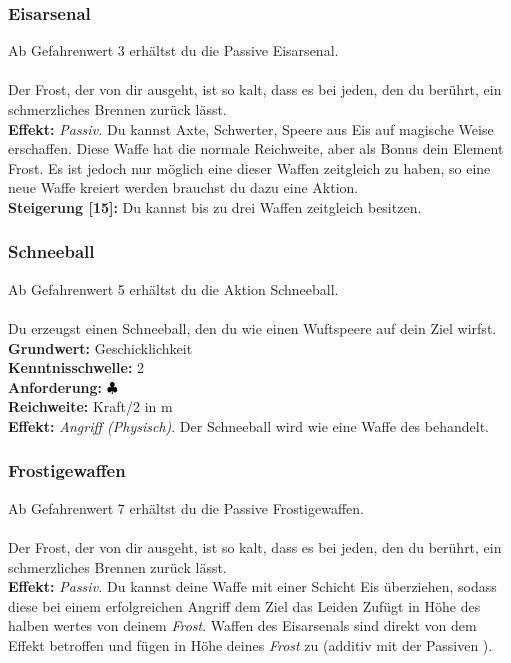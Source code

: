 \subsubsection*{ Eisarsenal} \label{sk:eisarsenal}
Ab Gefahrenwert 3 erhältst du die Passive Eisarsenal.\\
\\
Der Frost, der von dir ausgeht, ist so kalt, dass es bei jeden, den du berührt, ein schmerzliches Brennen zurück lässt.\\
\textbf{Effekt:} \textit{Passiv.} Du kannst Axte, Schwerter, Speere aus Eis auf magische Weise erschaffen. Diese Waffe hat die normale Reichweite, aber als Bonus dein Element Frost. Es ist jedoch nur möglich eine dieser Waffen zeitgleich zu haben, so eine neue Waffe kreiert werden brauchst du dazu eine Aktion.\\
\textbf{Steigerung [15]:} Du kannst bis zu drei Waffen zeitgleich besitzen.

\subsubsection*{ Schneeball} \label{sk:schneeball}
Ab Gefahrenwert 5 erhältst du die Aktion Schneeball.\\
\\
Du erzeugst einen Schneeball, den du wie einen Wuftspeere auf dein Ziel wirfst.\\
\textbf{Grundwert:} Geschicklichkeit \\
\textbf{Kenntnisschwelle:} 2 \\
\textbf{Anforderung:} ${\color{blue} }{\color{black}\clubsuit}$ \\
\textbf{Reichweite:} Kraft/2 in m \\
\textbf{Effekt:} \textit{Angriff (Physisch)}. Der Schneeball wird wie eine Waffe des  behandelt.

\subsubsection*{ Frostigewaffen} \label{sk:frostigewaffen}
Ab Gefahrenwert 7 erhältst du die Passive Frostigewaffen.\\
\\
Der Frost, der von dir ausgeht, ist so kalt, dass es bei jeden, den du berührt, ein schmerzliches Brennen zurück lässt.\\
\textbf{Effekt:} \textit{Passiv.} Du kannst deine Waffe mit einer Schicht Eis überziehen, sodass diese bei einem erfolgreichen Angriff dem Ziel das Leiden  Zufügt in Höhe des halben wertes von deinem \textit{ Frost}. Waffen des Eisarsenals sind direkt von dem Effekt betroffen und fügen  in Höhe deines \textit{ Frost} zu (additiv mit der Passiven ).

